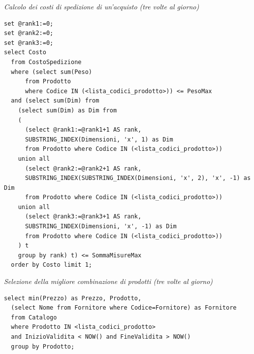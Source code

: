 \noindent\textit{Calcolo dei costi di spedizione di un'acquisto (tre volte al giorno)}
\begin{verbatim}
set @rank1:=0;
set @rank2:=0;
set @rank3:=0;
select Costo
  from CostoSpedizione
  where (select sum(Peso)
      from Prodotto
      where Codice IN (<lista_codici_prodotto>)) <= PesoMax
  and (select sum(Dim) from
    (select sum(Dim) as Dim from
    (
      (select @rank1:=@rank1+1 AS rank,
      SUBSTRING_INDEX(Dimensioni, 'x', 1) as Dim
      from Prodotto where Codice IN (<lista_codici_prodotto>))
    union all
      (select @rank2:=@rank2+1 AS rank,
      SUBSTRING_INDEX(SUBSTRING_INDEX(Dimensioni, 'x', 2), 'x', -1) as Dim
      from Prodotto where Codice IN (<lista_codici_prodotto>))
    union all
      (select @rank3:=@rank3+1 AS rank,
      SUBSTRING_INDEX(Dimensioni, 'x', -1) as Dim
      from Prodotto where Codice IN (<lista_codici_prodotto>))
    ) t
    group by rank) t) <= SommaMisureMax
  order by Costo limit 1;
\end{verbatim}
\vspace{0.5cm}

\noindent{}
\newline\newline

\noindent\textit{Selezione della migliore combinazione di prodotti (tre volte al giorno)}
\begin{verbatim}
select min(Prezzo) as Prezzo, Prodotto,
  (select Nome from Fornitore where Codice=Fornitore) as Fornitore
  from Catalogo
  where Prodotto IN <lista_codici_prodotto>
  and InizioValidita < NOW() and FineValidita > NOW()
  group by Prodotto;
\end{verbatim}
\vspace{0.5cm}

\noindent{}
\newline\newline

